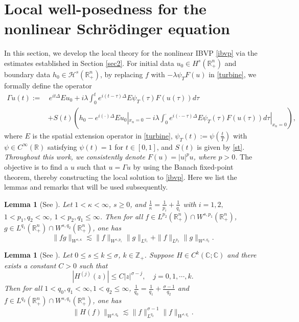 \documentclass[preprint,compress,12pt]{elsarticle}
\newtheorem{lemma}[theorem]{Lemma}
\numberwithin{equation}{section}
\begin{document}
\section{Local well-posedness for the nonlinear Schr\"{o}dinger equation}\label{sec3}
In this section, we develop the local theory for the nonlinear IBVP \eqref{ibvp} via the estimates established in Section \ref{sec2}. For initial data $u_{0}\in H^{s}(\mathbb{R}^{n}_{+})$ and boundary data  $h_{0} \in \mathcal{H}^{s}(\mathbb{R}_{+}^{n})$, by replacing $f$ with $-\lambda\psi_{T}F(u)$ in \eqref{turbine}, we formally define the operator
\begin{equation}\label{ahha}
	\begin{aligned}
		\Gamma u(t):=&\,e^{it\Delta}Eu_{0}+i\lambda\int_{0}^{t}e^{i(t-\tau)\Delta}E\psi_{T}(\tau)F(u(\tau))d\tau\\	&+S(t)\left(h_{0}-e^{i(\cdot)\Delta}Eu_{0}|_{x_{n}=0}-i\lambda\int_{0}^{\cdot}e^{i(\cdot-\tau)\Delta}E\psi_{T}(\tau)F(u(\tau))d\tau|_{x_{n}=0}\right),
	\end{aligned}
\end{equation}
where $E$ is the spatial extension operator in \eqref{turbine}, $\psi_{T}(t):=\psi\left(\frac{t}{T}\right)$ with $\psi\in C^{\infty}(\mathbb{R})$ satisfying $\psi(t)=1$ for $t\in[0,1]$, and $S(t)$ is given by \eqref{st}.   \emph{Throughout this work, we consistently denote $F(u)=|u|^{p}u$, where $p>0$.} The objective is to find a $u$ such that $u=\Gamma u$ by using the Banach fixed-point theorem, thereby constructing the local solution to \eqref{ibvp}. Here we list the lemmas and remarks that will be used subsequently.
\begin{lemma}[See \cite{gul}]\label{elicit}
	Let $1<\kappa<\infty$, $s\geq0$, and  $\frac{1}{\kappa}=\frac{1}{p_{i}}+\frac{1}{q_{i}}$ with $i=1,2,$
	$1<p_{1},q_{2}<\infty$, $1<p_{2},q_{1}\leq\infty$. Then for all $f\in L^{p_{2}}(\mathbb{R}^{n}_{+})\cap W^{s,p_{1}}(\mathbb{R}^{n}_{+})$, $g\in L^{q_{1}}(\mathbb{R}^{n}_{+})\cap W^{s,q_{2}}(\mathbb{R}^{n}_{+})$, one has
	\begin{equation}\label{trot}
		\|fg\|_{W^{s,\kappa}}\lesssim \|f\|_{W^{s,p_{1}}} \|g\|_{L^{q_{1}}} +\|f\|_{L^{p_{2}}}\|g\|_{W^{s,q_{2}}}.
	\end{equation}
\end{lemma}
\begin{lemma}[See \cite{fanxian}]\label{accessory}
	Let $0\leq s\leq k\leq \sigma$, $k\in\mathbb{Z}_{+}$. Suppose $H\in C^{k}(\mathbb{C};\mathbb{C})$ and there exists a constant $C>0$ such that
	\begin{equation*}
		\left|H^{(j)}(z)\right|\leq C |z|^{\sigma-j}, \quad j=0,1, \cdots,k.
	\end{equation*}
	Then for all $1<q_{0},q_{1}<\infty, 1<q_{2}\leq\infty$, $\frac{1}{q_{0}}=\frac{1}{q_{1}}+\frac{\sigma-1}{q_{2}}$ and $f\in L^{q_{2}}(\mathbb{R}^{n}_{+})\cap W^{s,q_{1}}(\mathbb{R}^{n}_{+})$, one has
	\begin{equation}\label{riesz}
		\|H(f)\|_{W^{s,q_{0} }}\lesssim \|f\|_{L^{q_{2}}}^{\sigma-1}\|f\|_{W^{s,q_{1}}}.
	\end{equation}
\end{lemma}
\end{document}
